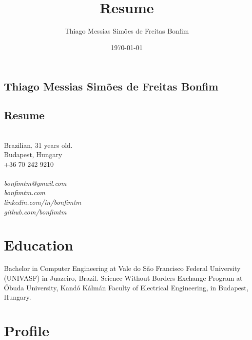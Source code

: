 \documentclass[10pt]{article}
\begin{document}
\title{Resume}

\author{Thiago Messias Simões de Freitas Bonfim}

\date{\today}


\begin{center}

\section*{Thiago Messias Simões de Freitas Bonfim}

\subsection*{Resume}

\noindent\\
Brazilian, 31 years old.\\

Budapest, Hungary\\

+36 70 242 9210\\~\\
\emph{bonfimtm@gmail.com}\\
\emph{bonfimtm.com}\\
\emph{linkedin.com/in/bonfimtm}\\
\emph{github.com/bonfimtm}\\

\end{center}


\section*{Education}

Bachelor in Computer Engineering at Vale do São Francisco Federal University (UNIVASF) in Juazeiro, Brazil. Science Without Borders Exchange Program at Óbuda University, Kandó Kálmán Faculty of Electrical Engineering, in Budapest, Hungary.


\section*{Profile}
\end{document}
